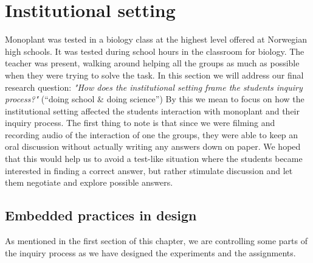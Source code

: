 






\section{Institutional setting}
Monoplant was tested in a biology class at the highest level offered at Norwegian high schools. It was tested during school hours in the classroom for biology. The teacher was present, walking around helping all the groups as much as possible when they were trying to solve the task. In this section we will address our final research question: \emph{"How does the institutional setting frame the students inquiry process?"} (“doing school \& doing science”)
By this we mean to focus on how the institutional setting affected the students interaction with monoplant and their inquiry process. The first thing to note is that since we were filming and recording audio of the interaction of one the groups, they were able to keep an oral discussion without actually writing any answers down on paper. We hoped that this would help us to avoid a test-like situation where the students became interested in finding a correct answer, but rather stimulate discussion and let them negotiate and explore possible answers.

\subsection{Embedded practices in design}
As mentioned in the first section of this chapter, we are controlling some parts of the inquiry process as we have designed the experiments and the assignments. 

